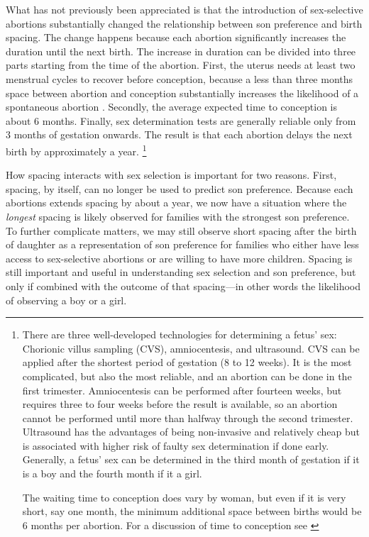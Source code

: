 \documentclass[12pt,letterpaper]{article}
\begin{document}


What has not previously been appreciated is that the introduction of sex-selective 
abortions substantially changed the relationship between son preference and birth spacing.
The change happens because each abortion significantly increases the duration until the
next birth.
The increase in duration can be divided into three parts starting from the time of
the abortion.
First, the uterus needs at least two menstrual cycles to recover 
before conception, because a less than three months space 
between abortion and conception substantially increases the likelihood 
of a spontaneous abortion \citep{zhou00b}.
Secondly, the average expected time to conception is about 6 months.
Finally, sex determination tests are generally reliable only from 3 months of gestation onwards.
The result is that each abortion delays the next birth by approximately a year.%
\footnote{
There are three well-developed technologies for determining a fetus' sex: 
Chorionic villus sampling (CVS), amniocentesis, and ultrasound.
CVS can be applied after the shortest period
of gestation (8 to 12 weeks).
It is the most complicated, but also the most reliable, and an abortion can be done in 
the first trimester.
Amniocentesis can be performed after fourteen weeks, but requires three to four weeks
before the result is available, so an abortion cannot be performed until more than 
halfway through the second trimester.
Ultrasound has the advantages of being non-invasive and relatively cheap but 
is associated with higher risk of faulty sex determination if done early.
Generally, a fetus' sex can be determined in the third month of gestation if it is a
boy and the fourth month if it a girl.

The waiting time to conception does vary by woman, but
even if it is very short, say one  month, the minimum additional space between
births would be 6 months per abortion.
For a discussion of time to conception see \citep{Wang2003}
}

How spacing interacts with sex selection is important for two reasons.
First, 
spacing, by itself, can no longer be used to predict son preference. 
Because each abortions extends spacing by about a year, we now have a situation 
where the \emph{longest} spacing is likely observed for families with the 
strongest son preference.
To further complicate matters, 
we may still observe short spacing after the birth of daughter as a representation 
of son preference for families who either have less access to sex-selective 
abortions or are willing to have more children.
Spacing is still important and useful in understanding sex selection and son
preference, but only if combined with the outcome of that spacing---in other words 
the likelihood of observing a boy or a girl.
\end{document}
